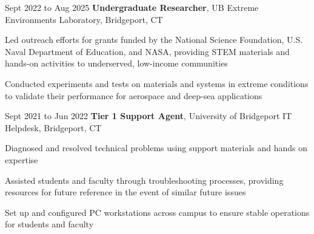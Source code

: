     \vspace{0.2 cm}
    
    \begin{twocolentry}{Sept 2022 to Aug 2025}
        \textbf{Undergraduate Researcher}, UB Extreme Environments Laboratory, Bridgeport, CT\end{twocolentry}

    \vspace{0.10 cm}
    \begin{onecolentry}
        \begin{highlights}
            \item Led outreach efforts for grants funded by the National Science Foundation, U.S. Naval Department of Education, and NASA, providing STEM materials and hands-on activities to underserved, low-income communities
            \item Conducted experiments and tests on materials and systems in extreme conditions to validate their performance for aerospace and deep-sea applications
        \end{highlights}
    \end{onecolentry}

    \vspace{0.2 cm}

    \begin{twocolentry}{
        Sept 2021 to Jun 2022
    }
        \textbf{Tier 1 Support Agent}, University of Bridgeport IT Helpdesk, Bridgeport, CT\end{twocolentry}

    \vspace{0.10 cm}
    \begin{onecolentry}
        \begin{highlights}
            \item Diagnosed and resolved technical problems using support materials and hands on expertise
            \item Assisted students and faculty through troubleshooting processes, providing resources for future reference in the event of similar future issues
            \item Set up and configured PC workstations across campus to ensure stable operations for students and faculty
        \end{highlights}
    \end{onecolentry}